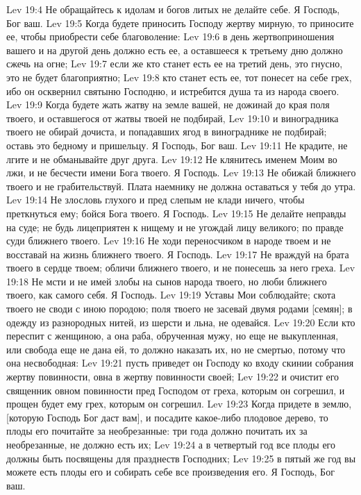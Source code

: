 Lev 19:4  Не обращайтесь к идолам и богов литых не делайте себе. Я Господь, Бог ваш.
Lev 19:5  Когда будете приносить Господу жертву мирную, то приносите ее, чтобы приобрести себе благоволение:
Lev 19:6  в день жертвоприношения вашего и на другой день должно есть ее, а оставшееся к третьему дню должно сжечь на огне;
Lev 19:7  если же кто станет есть ее на третий день, это гнусно, это не будет благоприятно;
Lev 19:8  кто станет есть ее, тот понесет на себе грех, ибо он осквернил святыню Господню, и истребится душа та из народа своего.
Lev 19:9  Когда будете жать жатву на земле вашей, не дожинай до края поля твоего, и оставшегося от жатвы твоей не подбирай,
Lev 19:10  и виноградника твоего не обирай дочиста, и попадавших ягод в винограднике не подбирай; оставь это бедному и пришельцу. Я Господь, Бог ваш.
Lev 19:11  Не крадите, не лгите и не обманывайте друг друга.
Lev 19:12  Не клянитесь именем Моим во лжи, и не бесчести имени Бога твоего. Я Господь.
Lev 19:13  Не обижай ближнего твоего и не грабительствуй. Плата наемнику не должна оставаться у тебя до утра.
Lev 19:14  Не злословь глухого и пред слепым не клади ничего, чтобы преткнуться ему; бойся Бога твоего. Я Господь.
Lev 19:15  Не делайте неправды на суде; не будь лицеприятен к нищему и не угождай лицу великого; по правде суди ближнего твоего.
Lev 19:16  Не ходи переносчиком в народе твоем и не восставай на жизнь ближнего твоего. Я Господь.
Lev 19:17  Не враждуй на брата твоего в сердце твоем; обличи ближнего твоего, и не понесешь за него греха.
Lev 19:18  Не мсти и не имей злобы на сынов народа твоего, но люби ближнего твоего, как самого себя. Я Господь.
Lev 19:19  Уставы Мои соблюдайте; скота твоего не своди с иною породою; поля твоего не засевай двумя родами [семян]; в одежду из разнородных нитей, из шерсти и льна, не одевайся.
Lev 19:20  Если кто переспит с женщиною, а она раба, обрученная мужу, но еще не выкупленная, или свобода еще не дана ей, то должно наказать их, но не смертью, потому что она несвободная:
Lev 19:21  пусть приведет он Господу ко входу скинии собрания жертву повинности, овна в жертву повинности своей;
Lev 19:22  и очистит его священник овном повинности пред Господом от греха, которым он согрешил, и прощен будет ему грех, которым он согрешил.
Lev 19:23  Когда придете в землю, [которую Господь Бог даст вам], и посадите какое-либо плодовое дерево, то плоды его почитайте за необрезанные: три года должно почитать их за необрезанные, не должно есть их;
Lev 19:24  а в четвертый год все плоды его должны быть посвящены для празднеств Господних;
Lev 19:25  в пятый же год вы можете есть плоды его и собирать себе все произведения его. Я Господь, Бог ваш.

